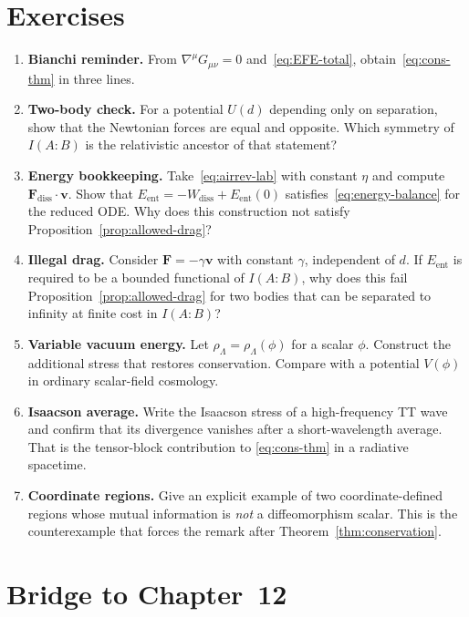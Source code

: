 \section{Exercises}
\label{sec:ch11-exercises}

\begin{enumerate}
  \item \textbf{Bianchi reminder.}
    From \(\nabla^\mu G_{\mu\nu}=0\) and~\eqref{eq:EFE-total},
    obtain~\eqref{eq:cons-thm} in three lines.
  \item \textbf{Two-body check.}
    For a potential \(U(d)\) depending only on separation, show
    that the Newtonian forces are equal and opposite. Which
    symmetry of \(I(A:B)\) is the relativistic ancestor of that
    statement?
  \item \textbf{Energy bookkeeping.}
    Take~\eqref{eq:airrev-lab} with constant \(\eta\) and compute
    \(\mathbf{F}_{\mathrm{diss}}\cdot\mathbf{v}\). Show that
    \(E_{\mathrm{ent}}=-W_{\mathrm{diss}}+E_{\mathrm{ent}}(0)\)
    satisfies~\eqref{eq:energy-balance} for the reduced ODE. Why
    does this construction not satisfy
    Proposition~\ref{prop:allowed-drag}?
  \item \textbf{Illegal drag.}
    Consider \(\mathbf{F}=-\gamma\mathbf{v}\) with constant
    \(\gamma\), independent of \(d\). If \(E_{\mathrm{ent}}\) is
    required to be a bounded functional of \(I(A:B)\), why does this
    fail Proposition~\ref{prop:allowed-drag} for two bodies that can
    be separated to infinity at finite cost in \(I(A:B)\)?
  \item \textbf{Variable vacuum energy.}
    Let \(\rho_\Lambda=\rho_\Lambda(\phi)\) for a scalar
    \(\phi\). Construct the additional stress that restores
    conservation. Compare with a potential \(V(\phi)\) in
    ordinary scalar-field cosmology.
  \item \textbf{Isaacson average.}
    Write the Isaacson stress of a high-frequency TT wave and
    confirm that its divergence vanishes after a short-wavelength
    average. That is the tensor-block contribution to
    \eqref{eq:cons-thm} in a radiative spacetime.
  \item \textbf{Coordinate regions.}
    Give an explicit example of two coordinate-defined regions
    whose mutual information is \emph{not} a diffeomorphism
    scalar. This is the counterexample that forces the remark
    after Theorem~\ref{thm:conservation}.
\end{enumerate}

\section{Bridge to Chapter~12}
\label{sec:ch11-bridge}


